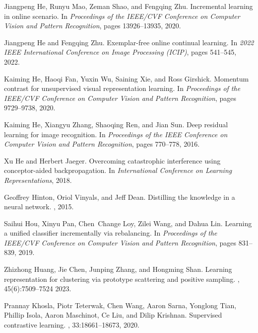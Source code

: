 \documentclass[10pt,twocolumn,letterpaper]{article}
\begin{document}
{\begin{thebibliography}{10}
Jiangpeng He, Runyu Mao, Zeman Shao, and Fengqing Zhu.
\newblock Incremental learning in online scenario.
\newblock In {\em Proceedings of the IEEE/CVF Conference on Computer Vision and
  Pattern Recognition}, pages 13926--13935, 2020.

Jiangpeng He and Fengqing Zhu.
\newblock Exemplar-free online continual learning.
\newblock In {\em 2022 IEEE International Conference on Image Processing
  (ICIP)}, pages 541--545, 2022.

Kaiming He, Haoqi Fan, Yuxin Wu, Saining Xie, and Ross Girshick.
\newblock Momentum contrast for unsupervised visual representation learning.
\newblock In {\em Proceedings of the IEEE/CVF Conference on Computer Vision and
  Pattern Recognition}, pages 9729--9738, 2020.

Kaiming He, Xiangyu Zhang, Shaoqing Ren, and Jian Sun.
\newblock Deep residual learning for image recognition.
\newblock In {\em Proceedings of the IEEE Conference on Computer Vision and
  Pattern Recognition}, pages 770--778, 2016.

Xu He and Herbert Jaeger.
\newblock Overcoming catastrophic interference using conceptor-aided
  backpropagation.
\newblock In {\em International Conference on Learning Representations}, 2018.

Geoffrey Hinton, Oriol Vinyals, and Jeff Dean.
\newblock Distilling the knowledge in a neural network.
, 2015.

Saihui Hou, Xinyu Pan, Chen~Change Loy, Zilei Wang, and Dahua Lin.
\newblock Learning a unified classifier incrementally via rebalancing.
\newblock In {\em Proceedings of the IEEE/CVF Conference on Computer Vision and
  Pattern Recognition}, pages 831--839, 2019.

Zhizhong Huang, Jie Chen, Junping Zhang, and Hongming Shan.
\newblock Learning representation for clustering via prototype scattering and
  positive sampling.
, 45(6):7509--7524
  2023.

Prannay Khosla, Piotr Teterwak, Chen Wang, Aaron Sarna, Yonglong Tian, Phillip
  Isola, Aaron Maschinot, Ce Liu, and Dilip Krishnan.
\newblock Supervised contrastive learning.
,
  33:18661--18673, 2020.


\end{thebibliography}}
\end{document}
